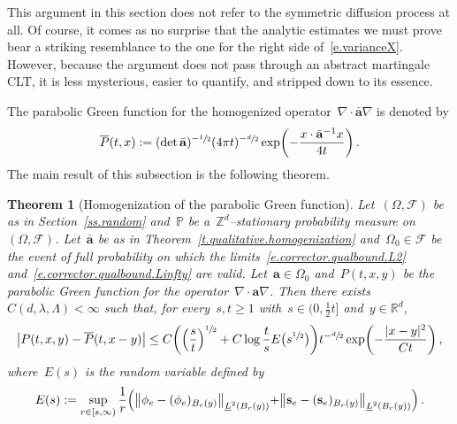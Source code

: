 \documentclass[11pt]{article} %
\numberwithin{equation}{section}
\newtheorem{theorem}{Theorem}[section]
\theoremstyle{definition}
\let\originalleft\left
\let\originalright\right
\renewcommand{\left}{\mathopen{}\mathclose\bgroup\originalleft}
\renewcommand{\right}{\aftergroup\egroup\originalright}
\newcommand*{\Zd}{\ensuremath{\mathbb{Z}^d}}
\newcommand*{\Rd}{\ensuremath{\mathbb{R}^d}}
\renewcommand{\a}{\mathbf{a}}
\newcommand{\ahom}{\bar{\a}}
\newcommand{\F}{\mathcal{F}}
\renewcommand{\P}{\mathbb{P}}
\begin{document}
\smallskip

This argument in this section does not refer to the symmetric diffusion process at all. Of course, it comes as no surprise that the analytic estimates we must prove bear a striking resemblance to the one for the right side of~\eqref{e.varianceX}. However, because the argument does not pass through an abstract martingale CLT, it is less mysterious, easier to quantify, and stripped down to its essence. 

\smallskip

The parabolic Green function for the homogenized operator~$\nabla \cdot\ahom \nabla$ is denoted by 
\begin{equation*}
\overline{P} (t,x) 
:= 
( \det \ahom )^{-\sfrac12} 
(4\pi t)^{-\sfrac d2} 
\exp \biggl( 
-\frac{x\cdot \ahom^{-1} x }{4t} 
\biggr)
\,.
\end{equation*}
The main result of this subsection is the following theorem. 

\begin{theorem}[Homogenization of the parabolic Green function] \hspace{-2pt} 
\label{t.parabolic.GF}
Let~$(\Omega,\F)$ be as in Section~\ref{ss.random} and~$\P$ be a~$\Zd$--stationary probability measure on~$(\Omega,\F)$. Let~$\ahom$ be as in Theorem~\ref{t.qualitative.homogenization} and~$\Omega_0 \in \F$ be the event of full probability on which the limits~\eqref{e.corrector.qualbound.L2} and~\eqref{e.corrector.qualbound.Linfty} are valid. 
Let~$\a\in \Omega_0$ and~$P(t,x,y)$ be the parabolic Green function for the operator~$\nabla \cdot \a\nabla$.
Then there exists~$C(d,\lambda,\Lambda) <\infty$ such that, for every~$s,t\geq 1$ with~$s \in (0,\tfrac12t]$ and~$y\in\Rd$, 
\begin{equation}
\label{e.P.to.Pbar}
\bigl| P(t,x,y) - \overline{P}(t,x-y) \bigr| 
\leq
C\biggl( 
\Bigl( \frac{s}{t} \Bigr)^{\sfrac12}
+
C  \log \frac{t}{s} 
E\bigl(s^{\sfrac12}\bigr) 
\biggr)
t^{-\sfrac d2} \exp \biggl( -\frac{|x-y|^2}{Ct} \biggr)
\,,
\end{equation}
where~$E(s)$ is the random variable defined by
\begin{equation} \label{e.Es.def}
E(s): =
\sup_{ r \in [s,\infty)} 
\frac1r
\Bigl( 
\left\| \phi_e - (\phi_e)_{B_r(y)} \right\|_{\underline{L}^2(B_{r}(y))}
{+} 
\left\| \mathbf{s}_e - (\mathbf{s}_e)_{B_r(y)} \right\|_{\underline{L}^2(B_{r}(y))}
\Bigr) 
\,.
\end{equation}
\end{theorem}
\end{document}

